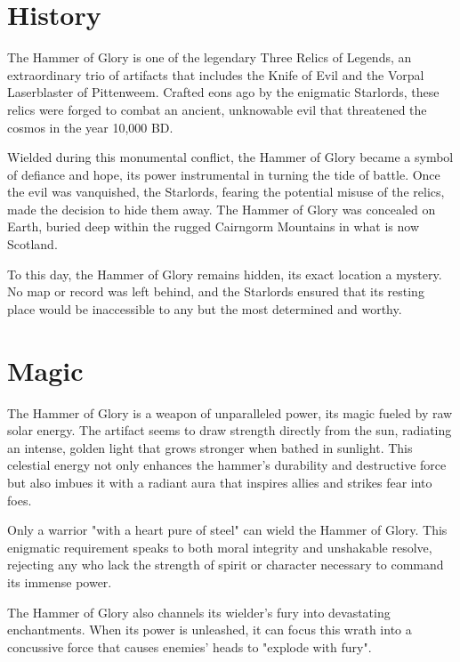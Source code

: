 \section*{History}
{\entryfont The Hammer of Glory is one of the legendary Three Relics of Legends, an extraordinary trio of artifacts that includes the Knife of Evil and the Vorpal Laserblaster of Pittenweem. Crafted eons ago by the enigmatic Starlords, these relics were forged to combat an ancient, unknowable evil that threatened the cosmos in the year 10,000 BD.

Wielded during this monumental conflict, the Hammer of Glory became a symbol of defiance and hope, its power instrumental in turning the tide of battle. Once the evil was vanquished, the Starlords, fearing the potential misuse of the relics, made the decision to hide them away. The Hammer of Glory was concealed on Earth, buried deep within the rugged Cairngorm Mountains in what is now Scotland.

To this day, the Hammer of Glory remains hidden, its exact location a mystery. No map or record was left behind, and the Starlords ensured that its resting place would be inaccessible to any but the most determined and worthy.}

\section*{Magic}
{\entryfont The Hammer of Glory is a weapon of unparalleled power, its magic fueled by raw solar energy. The artifact seems to draw strength directly from the sun, radiating an intense, golden light that grows stronger when bathed in sunlight. This celestial energy not only enhances the hammer's durability and destructive force but also imbues it with a radiant aura that inspires allies and strikes fear into foes.

Only a warrior "with a heart pure of steel" can wield the Hammer of Glory. This enigmatic requirement speaks to both moral integrity and unshakable resolve, rejecting any who lack the strength of spirit or character necessary to command its immense power.

The Hammer of Glory also channels its wielder's fury into devastating enchantments. When its power is unleashed, it can focus this wrath into a concussive force that causes enemies' heads to "explode with fury".}

